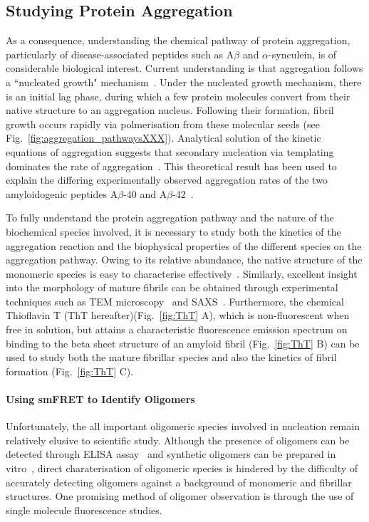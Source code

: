 \subsection{Studying Protein Aggregation}
As a consequence, understanding the chemical pathway of protein aggregation, particularly of disease-associated peptides such as A${\beta}$ and $\alpha$-synculein, is of considerable biological interest. Current understanding is that aggregation follows a ``nucleated growth" mechanism~\cite{chiti2006}. Under the nucleated growth mechanism, there is an initial lag phase, during which a few protein molecules convert from their native structure to an aggregation nucleus. Following their formation, fibril growth occurs rapidly via polmerisation from these molecular seeds (see Fig.~\ref{fig:aggregation_pathwaysXXX}). Analytical solution of the kinetic equations of aggregation suggests that secondary nucleation via templating dominates the rate of aggregation~\cite{knowles2009}. This theoretical result has been used to explain the differing experimentally observed aggregation rates of the two amyloidogenic peptides A$\beta$-40 and A$\beta$-42~\cite{cohen2013, meisl2014}.

To fully understand the protein aggregation pathway and the nature of the biochemical species involved, it is necessary to study both the kinetics of the aggregation reaction and the biophysical properties of the different species on the aggregation pathway. Owing to its relative abundance, the native structure of the monomeric species is easy to characterise effectively~\cite{???}. Similarly, excellent insight into the morphology of mature fibrils can be obtained through experimental techniques such as TEM microscopy~\cite{???} and SAXS~\cite{???}. Furthermore, the chemical Thioflavin T (ThT hereafter)(Fig.~\ref{fig:ThT} A), which is non-fluorescent when free in solution, but attains a characteristic fluorescence emission spectrum on binding to the beta sheet structure of an amyloid fibril (Fig.~\ref{fig:ThT} B) can be used to study both the mature fibrillar species and also the kinetics of fibril formation (Fig.~\ref{fig:ThT} C).

\paragraph{Using smFRET to Identify Oligomers}
Unfortunately, the all important oligomeric species involved in nucleation remain relatively elusive to scientific study. Although the presence of oligomers can be detected through ELISA assay~\cite{???} and synthetic oligomers can be prepared in vitro~\cite{???}, direct charaterisation of oligomeric species is hindered by the difficulty of accurately detecting oligomers against a background of monomeric and fibrillar structures. One promising method of oligomer observation is through the use of single molecule fluorescence studies.

